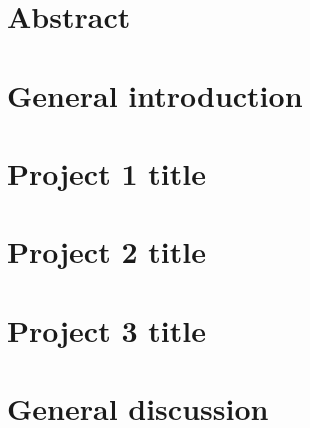 \documentclass[12pt, twoside, hidelinks]{report} %
\begin{document}
\chapter*{Abstract}
\markright{}


 \tableofcontents
 \newpage
 \listoffigures
 \newpage
 \listoftables

 \chapter{General introduction}
\setcounter{page}{1}


\chapter[Shorter title for TOC - Project 1]{Project 1 title} %


\chapter[Project 2]{Project 2 title} %

 
\chapter[Project 3]{Project 3 title} %
 
 
\chapter{General discussion}


\onehalfspacing  


\markright{}

 
\end{document}
